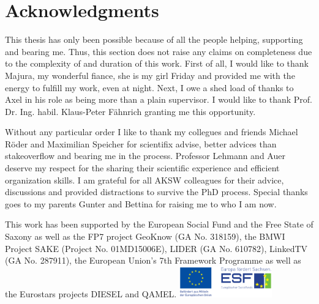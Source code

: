 



\bigskip

\begingroup
\let\clearpage\relax
\let\cleardoublepage\relax
\let\cleardoublepage\relax
\chapter*{Acknowledgments}
This thesis has only been possible because of all the people helping, supporting and bearing me.
Thus, this section does not raise any claims on completeness due to the complexity of and duration of this work.
First of all, I would like to thank Majura, my wonderful fiance, she is my girl Friday and provided me with the energy to fulfill my work, even at night.
Next, I owe a shed load of thanks to Axel in his role as being more than a plain supervisor. 
I would like to thank Prof. Dr. Ing. habil. Klaus-Peter F\"ahnrich granting me this opportunity.

Without any particular order I like to thank my collegues and friends Michael Röder and Maximilian Speicher for scientifix advise, better advices than stakeoverflow and bearing me in the process. 
Professor Lehmann and Auer deserve my respect for the sharing their scientific experience and efficient organization skills. 
I am grateful for all AKSW colleagues for their advice, discussions and provided distractions to survive the PhD process. 
Special thanks goes to my parents Gunter and Bettina for raising me to who I am now. 


\bigskip


This work has been supported by the European Social Fund and the Free State of Saxony as well as the FP7 project GeoKnow (GA No. 318159), the BMWI Project SAKE (Project No. 01MD15006E), LIDER (GA No. 610782), LinkedTV (GA No. 287911), the European Union's 7th Framework Programme as well as the Eurostars projects DIESEL and QAMEL.
 \includegraphics[width=0.3\textwidth]{figures/esf.pdf}
\endgroup



